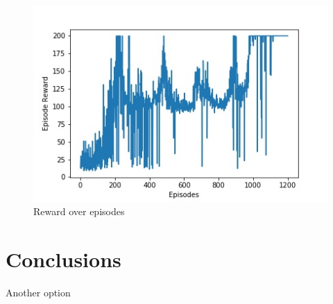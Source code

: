 \documentclass{article}
\begin{document}
\begin{figure}[h]
\centering
\includegraphics[scale=0.5]{rewardOverEpisodes}
\caption{Reward over episodes}
\label{fig:fig2}
\end{figure}

\section{Conclusions}
Another option 
\end{document}
